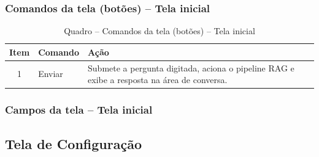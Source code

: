 \subsubsection{Comandos da tela (botões) – Tela inicial}

\begin{table}[H]
  \centering
  \caption{Quadro – Comandos da tela (botões) – Tela inicial}
  \label{tab:cmd_tela_inicial}
  \begin{tabular}{|c|p{4cm}|p{8cm}|}
    \hline
    \textbf{Item} & \textbf{Comando} & \textbf{Ação} \\ \hline
    1 & Enviar & Submete a pergunta digitada, aciona o pipeline RAG e exibe a resposta na área de conversa. \\ \hline
  \end{tabular}
\end{table}


\subsubsection{Campos da tela – Tela inicial}


\begin{table}[H]
  \centering
  \caption{Quadro 1 – Campos da tela – Tela Inicial}
  \label{tab:campos_tela_inicial}
  \vspace{0.2cm}
\end{table}

\subsection{Tela de Configuração}
\label{subsec:tela_configuracao}

